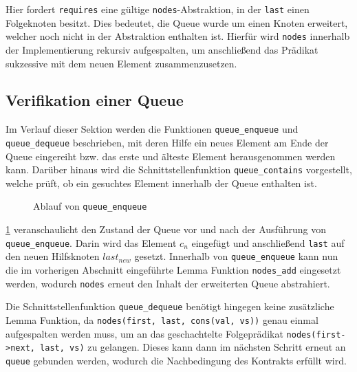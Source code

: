 \noindent
Hier fordert \texttt{requires} eine gültige \texttt{nodes}-Abstraktion, in der \texttt{last} einen Folgeknoten besitzt. Dies bedeutet, die Queue wurde um einen Knoten erweitert, welcher noch nicht in der Abstraktion enthalten ist. Hierfür wird \texttt{nodes} innerhalb der Implementierung rekursiv aufgespalten, um anschließend das Prädikat sukzessive mit dem neuen Element zusammenzusetzen.

\subsection{Verifikation einer Queue}
\label{subsec:queue}

Im Verlauf dieser Sektion werden die Funktionen \texttt{queue\_enqueue} und \texttt{queue\_dequeue} beschrieben, mit deren Hilfe ein neues Element am Ende der Queue eingereiht bzw. das erste und älteste Element herausgenommen werden kann. Darüber hinaus wird die Schnittstellenfunktion \texttt{queue\_contains} vorgestellt, welche prüft, ob ein gesuchtes Element innerhalb der Queue enthalten ist.

\begin{figure}[t]
	\centering
	
	\caption{Ablauf von \texttt{queue\_enqueue}}
	\label{fig:list}
\end{figure}

\cref{fig:list} veranschaulicht den Zustand der Queue vor und nach der Ausführung von \texttt{queue\_enqueue}. Darin wird das Element $c_{n}$ eingefügt und anschließend \texttt{last} auf den neuen Hilfsknoten $last_{new}$ gesetzt. Innerhalb von \texttt{queue\_enqueue} kann nun die im vorherigen Abschnitt eingeführte Lemma Funktion \texttt{nodes\_add} eingesetzt werden, wodurch \texttt{nodes} erneut den Inhalt der erweiterten Queue abstrahiert.

Die Schnittstellenfunktion \texttt{queue\_dequeue} benötigt hingegen keine zusätzliche Lemma Funktion, da \texttt{nodes(first, last, cons(val, vs))} genau einmal aufgespalten werden muss, um an das geschachtelte Folgeprädikat \texttt{nodes(first->next, last, vs)} zu gelangen. Dieses kann dann im nächsten Schritt erneut an \texttt{queue} gebunden werden, wodurch die Nachbedingung des Kontrakts erfüllt wird.

